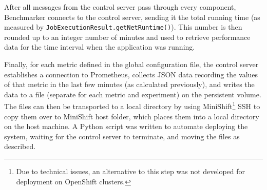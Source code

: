 \documentclass{article}
\begin{document}
After all messages from the control server pass through every component,
Benchmarker connects to the control server, sending it the total running time
(as measured by \texttt{JobExecutionResult.getNetRuntime()}). This number is
then rounded up to an integer number of minutes and used to retrieve performance
data for the time interval when the application was running.

Finally, for each metric defined in the global configuration file, the control
server establishes a connection to Prometheus, collects JSON data
recording the values of that metric in the last few minutes (as calculated
previously), and writes the data to a file (separate for each metric and
experiment) on the persistent volume. The files can then be transported to a
local directory by using MiniShift\footnote{Due to technical issues, an
  alternative to this step was not developed for deployment on OpenShift
  clusters.} SSH to copy them over to MiniShift host folder, which places them
into a local directory on the host machine. A Python script was written to
automate deploying the system, waiting for the control server to terminate, and
moving the files as described.
\end{document}
